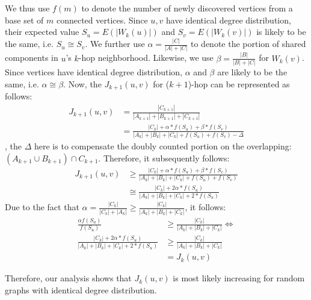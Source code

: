 We thus use $f(m)$ to denote the number of newly discovered vertices
from a base set of $m$ connected vertices. Since $u,v$ have 
identical degree distribution, their expected value $S_u=E(|W_k(u)|)$
and $S_v=E(|W_k(v)|)$ is likely to be the same, i.e. $S_u \cong S_v$.
We further use $\alpha = \frac{|C|}{|A|+|C|}$ to denote the portion of shared
components in $u$'s $k$-hop neighborhood. Likewise, we use $\beta = \frac{|B|}{|B|+|C|}$ for 
$W_k(v)$. Since vertices have identical degree distribution, $\alpha$ and $\beta$ are likely
to be the same, i.e. $\alpha \cong \beta$.
Now, the $J_{k+1}(u,v)$ for ($k+1$)-hop can be represented as follows:
\begin{equation}
\begin{split}
J_{k+1}(u,v) & = \frac{|C_{k+1}|}{|A_{k+1}| + |B_{k+1}| + |C_{k+1}|} \\
	& = \frac{|C_k| + \alpha * f(S_u) + \beta * f(S_v)}{|A_k| +|B_k| +|C_k| +f(S_u) +  f(S_v) -\Delta} 
\end{split}
\end{equation}
, the $\Delta$ here is to compensate the doubly counted portion on the
overlapping: $(A_{k+1} \cup B_{k+1}) \cap C_{k+1}$. Therefore, it subsequently follows:
\begin{equation}
\begin{split}
J_{k+1}(u,v) & \geq \frac{|C_k| + \alpha * f(S_u) + \beta * f(S_v)}{|A_k| +|B_k| +|C_k| +f(S_u) +  f(S_v)}  \\
		& \cong \frac{|C_k| + 2\alpha * f(S_u)}{|A_k|+|B_k|+|C_k| + 2 * f(S_u)}
\end{split}
\end{equation}
Due to the fact that $\alpha = \frac{|C_k|}{|C_k|+|A_k|} \geq \frac{|C_k|}{|A_k|+|B_k|+|C_k|}$, it follows:
\begin{equation}
\begin{split}
	\frac{\alpha f(S_u)}{f(S_u)} & \geq \frac{|C_k|}{|A_k|+|B_k|+|C_k|} \Leftrightarrow \\
	\frac{|C_k| + 2\alpha * f(S_u)}{|A_k|+|B_k|+|C_k| + 2 * f(S_u)} & \geq \frac{|C_k|}{|A_k|+|B_k|+|C_k|} \\
	& = J_k(u,v)
\end{split}
\end{equation}

Therefore, our analysis shows that $J_k(u,v)$ is most likely increasing for random graphs with identical
degree distribution.

